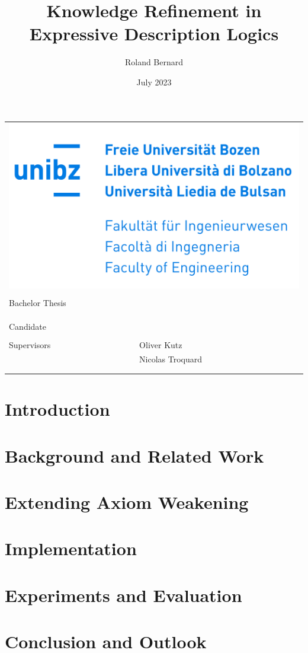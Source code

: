 \documentclass[10pt,a4paper]{report}
\title{Knowledge Refinement in Expressive Description Logics}
\author{Roland Bernard}
\date{July 2023}
\makeatletter
\theoremstyle{plain}
\theoremstyle{definition}
\theoremstyle{remark}
\def\maketitle{
    \begin{tabular}{ll}
        \multicolumn{2}{r}{\includegraphics[width=0.5\linewidth]{resources/unibz-logo.png}} \\
        \vspace*{40mm} \\
        \multicolumn{2}{l}{\raggedright Bachelor Thesis} \\
        \vspace*{1mm} \\
        \multicolumn{2}{p{\linewidth}}{\raggedright \huge \bf \@title} \\
        \vspace*{30mm} \\
        Candidate   & \@author \\
        \vspace*{5mm} \\
        Supervisors & Oliver Kutz \\
                    & Nicolas Troquard \\
        \vspace*{20mm} \\
        \multicolumn{2}{p{\linewidth}}{\@date}
    \end{tabular}
}
\makeatother
\begin{document}
\maketitle

\begin{abstract}
    
\end{abstract}

\tableofcontents

\begingroup
\renewcommand{\abstractname}{Acknowledgements}
\begin{abstract}
    
\end{abstract}
\endgroup

\chapter{Introduction} \label{introduction}



\chapter{Background and Related Work} \label{background}



\chapter{Extending Axiom Weakening} \label{theory}



\chapter{Implementation} \label{implementation}



\chapter{Experiments and Evaluation} \label{evaluation}



\chapter{Conclusion and Outlook} \label{conclusion}
\end{document}
